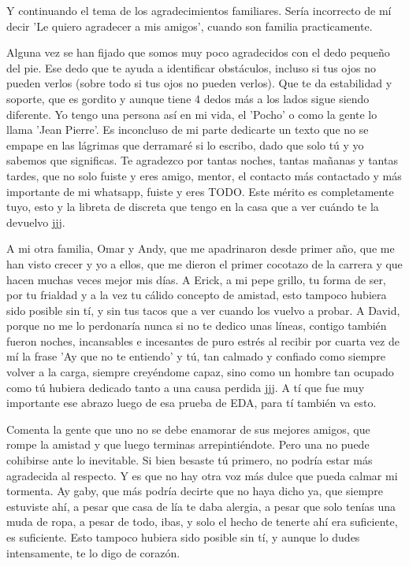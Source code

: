 \begin{acknowledgements}
    Y continuando el tema de los agradecimientos familiares. Sería incorrecto de mí decir 'Le quiero agradecer a mis amigos', cuando son familia practicamente.

    Alguna vez se han fijado que somos muy poco agradecidos con el dedo pequeño del pie. Ese dedo que te ayuda a identificar obstáculos, incluso si tus ojos no pueden verlos (sobre todo si tus ojos no pueden verlos). Que te da estabilidad y soporte, que es gordito y aunque tiene 4 dedos más a los lados sigue siendo diferente. Yo tengo una persona así en mi vida, el 'Pocho' o como la gente lo llama 'Jean Pierre'. Es inconcluso de mi parte dedicarte un texto que no se empape en las lágrimas que derramaré si lo escribo, dado que solo tú y yo sabemos que significas. Te agradezco por tantas noches, tantas mañanas y tantas tardes, que no solo fuiste y eres amigo, mentor, el contacto más contactado y más importante de mi whatsapp, fuiste y eres TODO. Este mérito es completamente tuyo, esto y la libreta de discreta que tengo en la casa que a ver cuándo te la devuelvo jjj.
    
    A mi otra familia, Omar y Andy, que me apadrinaron desde primer año, que me han visto crecer y yo a ellos, que me dieron el primer cocotazo de la carrera y que hacen muchas veces mejor mis días. A Erick, a mi pepe grillo, tu forma de ser, por tu frialdad y a la vez tu cálido concepto de amistad, esto tampoco hubiera sido posible sin tí, y sin tus tacos que a ver cuando los vuelvo a probar. A David, porque no me lo perdonaría nunca si no te dedico unas líneas, contigo también fueron noches, incansables e incesantes de puro estrés al recibir por cuarta vez de mí la frase 'Ay que no te entiendo' y tú, tan calmado y confiado como siempre volver a la carga, siempre creyéndome capaz, sino como un hombre tan ocupado como tú hubiera dedicado tanto a una causa perdida jjj. A tí que fue muy importante ese abrazo luego de esa prueba de EDA, para tí también va esto.

    Comenta la gente que uno no se debe enamorar de sus mejores amigos, que rompe la amistad y que luego terminas arrepintiéndote. Pero una no puede cohibirse ante lo inevitable. Si bien besaste tú primero, no podría estar más agradecida al respecto. Y es que no hay otra voz más dulce que pueda calmar mi tormenta. Ay gaby, que más podría decirte que no haya dicho ya, que siempre estuviste ahí, a pesar que casa de lía te daba alergia, a pesar que solo tenías una muda de ropa, a pesar de todo, ibas, y solo el hecho de tenerte ahí era suficiente, es suficiente. Esto tampoco hubiera sido posible sin tí, y aunque lo dudes intensamente, te lo digo de corazón.


\end{acknowledgements}
